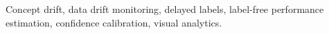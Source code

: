 \begin{IEEEkeywords}
Concept drift, data drift monitoring, delayed labels, label-free performance estimation, confidence calibration, visual analytics.
\end{IEEEkeywords}
